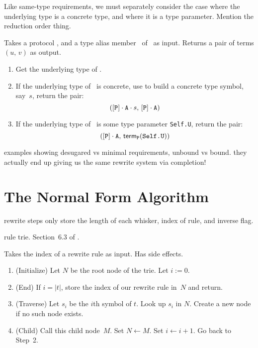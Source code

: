 \documentclass[../generics]{subfiles}
\begin{document}
Like same-type requirements, we must separately consider the case where the underlying type is a concrete type, and where it is a type parameter. Mention the reduction order thing.

\begin{algorithm}
Takes a protocol \tP, and a type alias member \nA\ of \tP\ as input. Returns a pair of terms $(u,\,v)$ as output.
\begin{enumerate}
\item Get the underlying type of \nA.
\item If the underlying type of \nA\ is concrete, use  to build a concrete type symbol, say~$s$, return the pair:
\[([\texttt{P}] \cdot \texttt{A} \cdot s,\, [\texttt{P}] \cdot \texttt{A})\]
\item If the underlying type of \nA\ is some type parameter \texttt{Self.U}, return the pair:
\[([\texttt{P}] \cdot \texttt{A},\, \mathsf{term}_{\texttt{P}}(\texttt{Self.U}))\]
\end{enumerate}
\end{algorithm}

examples showing desugared vs minimal requirements, unbound vs bound. they actually end up giving us the same rewrite system via completion!

\section{The Normal Form Algorithm}\label{term reduction}


rewrite steps only store the length of each whisker, index of rule, and inverse flag.

rule trie. Section~6.3 of \cite{art3}.

\begin{algorithm}\label{trie insert algo}
Takes the index of a rewrite rule as input. Has side effects.
\begin{enumerate}
\item (Initialize) Let $N$ be the root node of the trie. Let $i:=0$.
\item (End) If $i=|t|$, store the index of our rewrite rule in~$N$ and return.
\item (Traverse) Let $s_i$ be the $i$th symbol of $t$. Look up $s_i$ in $N$. Create a new node if no such node exists.
\item (Child) Call this child node~$M$. Set $N \leftarrow M$. Set $i \leftarrow i+1$. Go back to Step~2.
\end{enumerate}
\end{algorithm}
\end{document}
